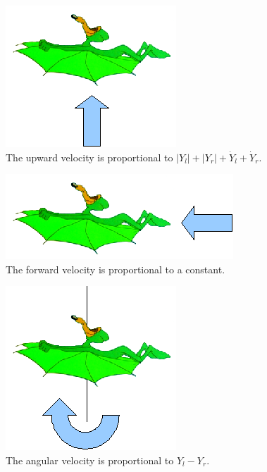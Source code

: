 \documentclass{article}
\begin{document}
\begin{figure}[h!t]
\begin{center}
\includegraphics{images/upward-velocity.png}
\end{center}
\caption{The upward velocity is proportional to $\left|Y_l\right|+\left|Y_r\right|+\dot{Y}_l+\dot{Y}_r$.}
\label{fig:upward-velocity}
\end{figure}

\begin{figure}[h!t]
\begin{center}
\includegraphics{images/forward-velocity.png}
\end{center}
\caption{The forward velocity is proportional to a constant.}
\label{fig:forward-velocity}
\end{figure}

\begin{figure}[h!t]
\begin{center}
\includegraphics{images/angular-velocity.png}
\end{center}
\caption{The angular velocity is proportional to $Y_l - Y_r$.}
\label{fig:angular-velocity}
\end{figure}
\end{document}

